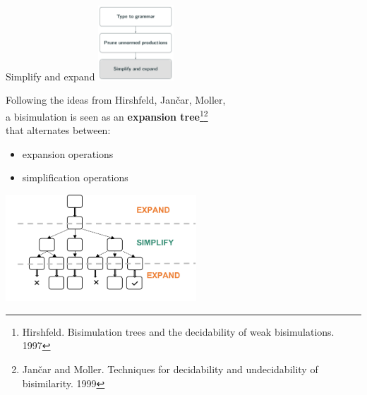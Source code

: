 \message{ !name(main.tex)}\documentclass[10pt]{beamer}
\begin{document}
\begin{frame} {Simplify and expand}
	\hfill\includegraphics[height=2.8cm]{img/simplifyExpand.png}
	
	\vspace*{-3cm}
	Following the ideas from Hirshfeld, Jan{\v{c}}ar, Moller, \\
	a bisimulation is seen as an {\bf expansion tree}\footnote{Hirshfeld. Bisimulation trees and the decidability of weak bisimulations. 1997}\footnote{Jan{\v{c}}ar and Moller. Techniques for decidability and undecidability of bisimilarity. 1999}\\ that alternates between:
	\begin{itemize}
		\item { expansion operations}
		\item { simplification operations	}
	\end{itemize}
	\begin{center}
		\hspace*{-2mm}\includegraphics[height=4cm]{img/expand_simplify}
	\end{center}	
\end{frame}
\end{document}
